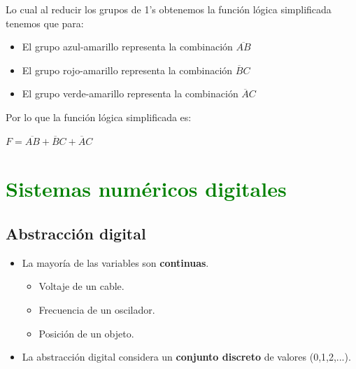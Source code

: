 \documentclass{templateNote}
\begin{document}
\begin{tcolorbox}[colback=blue!10!white,colframe=blue!75!black,title=Ejemplo]
\begin{center}
\end{center}
Lo cual al reducir los grupos de 1's obtenemos la función lógica simplificada tenemos que para:
\begin{itemize}
    \item El grupo azul-amarillo representa la combinación $\overline{AB}$
    \item El grupo rojo-amarillo representa la combinación $\overline{B}C$
    \item El grupo verde-amarillo representa la combinación $\overline{A}C$
\end{itemize} 
Por lo que la función lógica simplificada es:
\begin{center}
    \textbf{$F = \overline{AB} + \overline{B}C + \overline{A}C$}       
\end{center}
\end{tcolorbox}
\newpage

\section{\textcolor{green}{Sistemas numéricos digitales}}
\subsection{Abstracción digital}
\begin{itemize}
    \item La mayoría de las variables son \textbf{continuas}.
    \begin{itemize}
        \item Voltaje de un cable.
        \item Frecuencia de un oscilador.
        \item Posición de un objeto.
    \end{itemize}
    \item La abstracción digital considera un \textbf{conjunto discreto} de valores (0,1,2,...).
\end{itemize}
\end{document}
